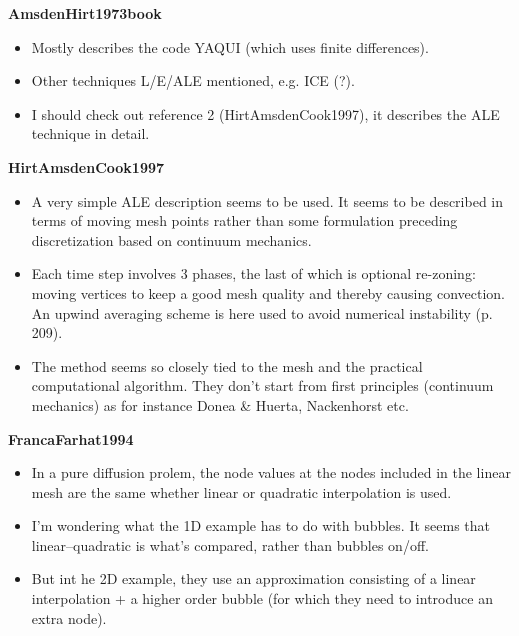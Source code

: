 \documentclass{article}
\begin{document}
\textbf{AmsdenHirt1973book}
\begin{itemize}
\item Mostly describes the code YAQUI (which uses finite differences).
\item Other techniques L/E/ALE mentioned, e.g. ICE (?).
\item I should check out reference 2 (HirtAmsdenCook1997), it describes the ALE technique in detail.
\end{itemize}

\textbf{HirtAmsdenCook1997}
\begin{itemize}
\item A very simple ALE description seems to be used. It seems to be described in terms of moving mesh points rather than some formulation preceding discretization based on continuum mechanics.
\item Each time step involves 3 phases, the last of which is optional re-zoning: moving vertices to keep a good mesh quality and thereby causing convection. An upwind averaging scheme is here used to avoid numerical instability (p. 209).
\item The method seems so closely tied to the mesh and the practical computational algorithm. They don't start from first principles (continuum mechanics) as for instance Donea \& Huerta, Nackenhorst etc.
\end{itemize}

\textbf{FrancaFarhat1994}
\begin{itemize}
\item In a pure diffusion prolem, the node values at the nodes included in the linear mesh are the same whether linear or quadratic interpolation is used.
\item I'm wondering what the 1D example has to do with bubbles. It seems that linear--quadratic is what's compared, rather than bubbles on/off.
\item But int he 2D example, they use an approximation consisting of a linear interpolation + a higher order bubble (for which they need to introduce an extra node).
\end{itemize}
\end{document}
